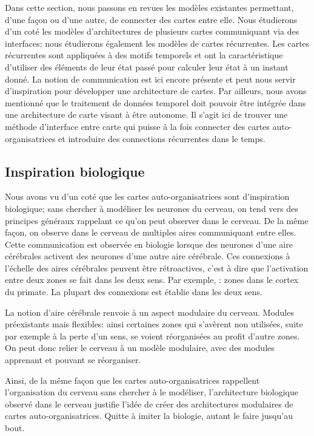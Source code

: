 \documentclass[../main]{subfiles}
\begin{document}
Dans cette section, nous passons en revues les modèles existantes permettant, d'une façon ou d'une autre, de connecter des cartes entre elle. Nous étudierons d'un coté les modèles d'architectures de plusieurs cartes communiquant via des interfaces; nous étudierons également les modèles de cartes récurrentes. Les cartes récurrentes sont appliquées à des motifs temporels et ont la caractéristique d'utiliser des éléments de leur état passé pour calculer leur état à un instant donné. La notion de communication est ici encore présente et peut nous servir d'inspiration pour développer une architecture de cartes. Par ailleurs, nous avons mentionné que le traitement de données temporel doit pouvoir être intégrée dans une architecture de carte visant à être autonome. Il s'agit ici de trouver une méthode d'interface entre carte qui puisse à la fois connecter des cartes auto-organisatrices et introduire des connections récurrentes dans le temps. 

\subsection{Inspiration biologique}
Nous avons vu d'un coté que les cartes auto-organisatrices sont d'inspiration biologique; sans chercher à modéliser les neurones du cerveau, on tend vers des principes généraux rappelant ce qu'on peut observer dans le cerveau. De la même façon, on observe dans le cerveau de multiples aires communiquant entre elles. Cette communication est observée en biologie lorsque des neurones d'une aire cérébrales activent des neurones d'une autre aire cérébrale. 
Ces connexions à l'échelle des aires cérébrales peuvent être rétroactives, c'est à dire que l'activation entre deux zones se fait dans les deux sens. Par exemple, \cite{primate_cortex_91}: zones dans le cortex du primate. La plupart des connexions est établie dans les deux sens.

La notion d'aire cérébrale renvoie à un aspect modulaire du cerveau. Modules préexistants mais flexibles: ainsi certaines zones qui s'avèrent non utilisées, suite par exemple à la perte d'un sens, se voient réorganisées au profit d'autre zones. On peut donc relier le cerveau à un modèle modulaire, avec des modules apprenant et pouvant se réorganiser.

Ainsi, de la même façon que les cartes auto-organisatrices rappellent l'organisation du cerveau sans chercher à le modéliser, l'architecture biologique observé dans le cerveau justifie l'idée de créer des architectures modulaires de cartes auto-organisatrices. Quitte à imiter la biologie, autant le faire jusqu'au bout.
\end{document}
